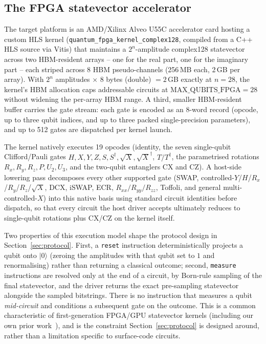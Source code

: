 \documentclass[pdflatex,sn-mathphys,Numbered]{sn-jnl}
\begin{document}
\subsection{The FPGA statevector accelerator}\label{sec:background-fpga}

The target platform is an AMD/Xilinx Alveo U55C accelerator card hosting a custom HLS kernel (\texttt{quantum\_fpga\_kernel\_complex128}, compiled from a C++ HLS source via Vitis) that maintains a $2^{n}$-amplitude complex128 statevector across two HBM-resident arrays -- one for the real part, one for the imaginary part -- each striped across 8 HBM pseudo-channels (256\,MB each, 2\,GB per array). With $2^{n}$ amplitudes $\times$ 8 bytes (double) $=2$\,GB exactly at $n=28$, the kernel's HBM allocation caps addressable circuits at $\text{MAX\_QUBITS\_FPGA}=28$ without widening the per-array HBM range. A third, smaller HBM-resident buffer carries the gate stream: each gate is encoded as an 8-word record (opcode, up to three qubit indices, and up to three packed single-precision parameters), and up to 512 gates are dispatched per kernel launch.

The kernel natively executes 19 opcodes (identity, the seven single-qubit Clifford/Pauli gates $H,X,Y,Z,S,S^\dagger,\sqrt X, \sqrt X^\dagger$, $T/T^\dagger$, the parametrised rotations $R_x,R_y,R_z,P,U_2,U_3$, and the two-qubit entanglers CX and CZ). A host-side lowering pass decomposes every other supported gate (SWAP, controlled-$Y$/$H$/$R_x$/$R_y$/$R_z$/$\sqrt X$, DCX, iSWAP, ECR, $R_{xx}/R_{yy}/R_{zz}$, Toffoli, and general multi-controlled-$X$) into this native basis using standard circuit identities before dispatch, so that every circuit the host driver accepts ultimately reduces to single-qubit rotations plus CX/CZ on the kernel itself.

Two properties of this execution model shape the protocol design in Section~\ref{sec:protocol}. First, a \texttt{reset} instruction deterministically projects a qubit onto $\lvert 0\rangle$ (zeroing the amplitudes with that qubit set to $1$ and renormalising) rather than returning a classical outcome; second, \texttt{measure} instructions are resolved only at the end of a circuit, by Born-rule sampling of the final statevector, and the driver returns the exact pre-sampling statevector alongside the sampled bitstrings. There is no instruction that measures a qubit \emph{mid-circuit} and conditions a subsequent gate on the outcome. This is a common characteristic of first-generation FPGA/GPU statevector kernels (including our own prior work~\cite{ali_rtl_statevector,ali_30qubit_sim}), and is the constraint Section~\ref{sec:protocol} is designed around, rather than a limitation specific to surface-code circuits.
\end{document}
